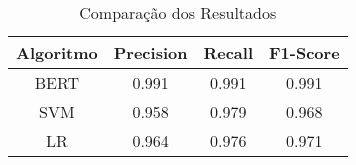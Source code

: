 \begin{table}[hbt]
\centering
\caption{Comparação dos Resultados}
 \label{table:comparativobert}
\begin{tabular}{ cccc  }
 \toprule
 \textbf{Algoritmo} & \textbf{Precision} & \textbf{Recall} & \textbf{F1-Score}\\
\midrule
 BERT & 0.991 & 0.991 & 0.991 \\
 SVM & 0.958 & 0.979 & 0.968 \\
 LR & 0.964 & 0.976 & 0.971  \\
 \bottomrule
\end{tabular}
\end{table}



